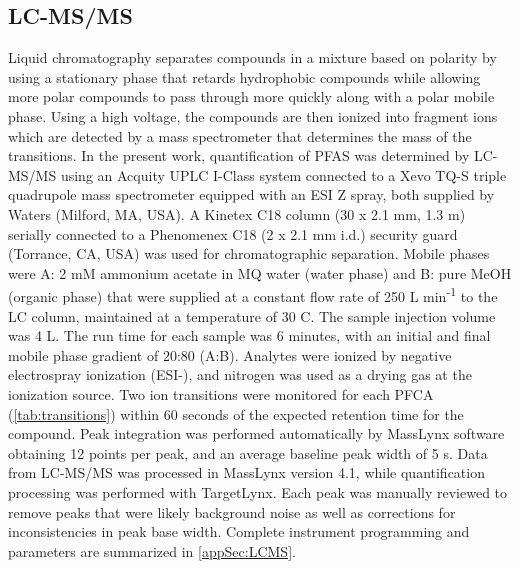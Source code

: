 \subsection{LC-MS/MS}
Liquid chromatography separates compounds in a mixture based on polarity by using a stationary phase that retards hydrophobic compounds while allowing more polar compounds to pass through more quickly along with a polar mobile phase. Using a high voltage, the compounds are then ionized into fragment ions which are detected by a mass spectrometer that determines the mass of the transitions. In the present work, quantification of PFAS was determined by \acrshort{LC-MS/MS} using an Acquity UPLC I-Class system connected to a Xevo TQ-S triple quadrupole mass spectrometer equipped with an ESI Z spray, both supplied by Waters (Milford, MA, USA). A Kinetex C18 column (30 x 2.1 mm, 1.3 \textmu m) serially connected to a Phenomenex C18 (2 x 2.1 mm i.d.) security guard (Torrance, CA, USA) was used for chromatographic separation. Mobile phases were A: 2 mM ammonium acetate in MQ water (water phase) and B: pure MeOH (organic phase) that were supplied at a constant flow rate of 250 \textmu L min\textsuperscript{-1} to the LC column, maintained at a temperature of 30 \textdegree C. The sample injection volume was 4 \textmu L. The run time for each sample was 6 minutes, with an initial and final mobile phase gradient of 20:80 (A:B). Analytes were ionized by negative electrospray ionization (\acrshort{ESI}-), and nitrogen was used as a drying gas at the ionization source. Two ion transitions were monitored for each PFCA (\cref{tab:transitions}) within 60 seconds of the expected retention time for the compound. Peak integration was performed automatically by MassLynx software obtaining 12 points per peak, and an average baseline peak width of 5 s. Data from LC-MS/MS was processed in MassLynx version 4.1, while quantification processing was performed with TargetLynx. Each peak was manually reviewed to remove peaks that were likely background noise as well as corrections for inconsistencies in peak base width. Complete instrument programming and parameters are summarized in \cref{appSec:LCMS}.



